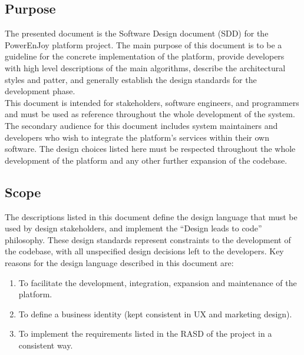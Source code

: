 \subsection{Purpose}
The presented document is the Software Design document (SDD) for the PowerEnJoy platform project. The main purpose of this document is to be a guideline for the concrete implementation of the platform, provide developers with high level descriptions of the main algorithms, describe the architectural styles and patter, and generally establish the design standards for the development
phase.\\
This document is intended for stakeholders, software engineers, and programmers and must be used as reference throughout the whole development of the system. The secondary audience for this document includes system maintainers and developers who wish to integrate the platform’s services within
their own software. The design choices listed here must be respected throughout the whole development of the platform and any other further expansion of the codebase.
\subsection{Scope}
The descriptions listed in this document define the design language that must
be used by design stakeholders, and implement the “Design leads to code” philosophy.
These design standards represent constraints to the development of
the codebase, with all unspecified design decisions left to the developers.
Key reasons for the design language described in this document are:
\begin{enumerate}
\item To facilitate the development, integration, expansion and maintenance of
the platform.
\item To define a business identity (kept consistent in UX and marketing design).
\item To implement the requirements listed in the RASD of the project in a consistent
way.
\end{enumerate}


